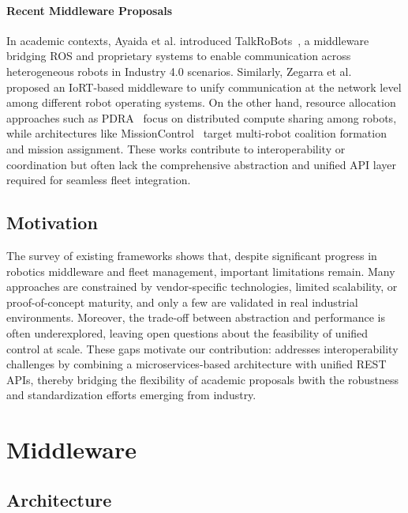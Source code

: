 \documentclass[conference]{IEEEtran}
\begin{document}
\paragraph{Recent Middleware Proposals} 
In academic contexts, Ayaida et al. introduced TalkRoBots~\cite{ayaida2022fi}, 
 a middleware bridging ROS and proprietary systems to enable communication 
 across heterogeneous robots in Industry 4.0 scenarios. 
% 
Similarly, Zegarra et al.~\cite{cuadroszegarra2024jsan} proposed an IoRT-based middleware 
 to unify communication at the network level among different robot operating systems. 
% 
On the other hand, resource allocation approaches such as PDRA~\cite{DBLP:conf/iros/RossiVNSH20} 
 focus on distributed compute sharing among robots, 
 while architectures like MissionControl~\cite{DBLP:journals/jss/RodriguesCAMRP22} 
  target multi-robot coalition formation and mission assignment. 
%  
These works contribute to interoperability or coordination but often lack the comprehensive abstraction 
 and unified API layer required for seamless fleet integration.

\subsection{Motivation}
The survey of existing frameworks shows that, 
 despite significant progress in robotics middleware and fleet management, important limitations remain. 
% 
Many approaches are constrained by vendor-specific technologies, limited scalability, 
 or proof-of-concept maturity, and only a few are validated in real industrial environments. 
% 
Moreover, the trade-off between abstraction and performance is often underexplored, 
 leaving open questions about the feasibility of unified control at scale. 
% 
These gaps motivate our contribution: 
 \approach{} addresses interoperability challenges by combining a microservices-based architecture 
  with unified REST APIs, thereby bridging the flexibility of academic proposals 
   bwith the robustness and standardization efforts emerging from industry.

\section{\approach{} Middleware}\label{sec:arc}
\subsection{Architecture}
\end{document}
